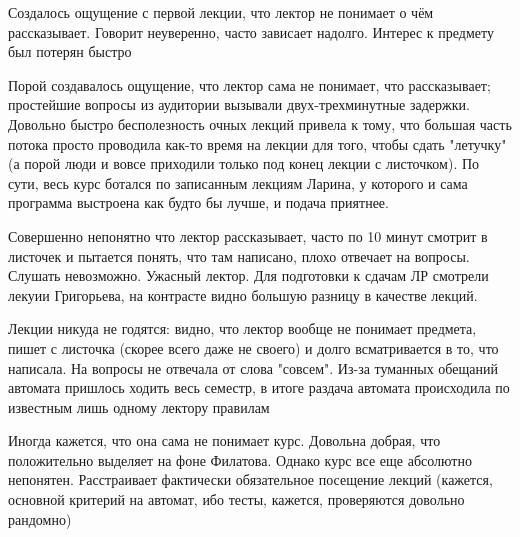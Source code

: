             \begin{commentbox} 
                Создалось ощущение с первой лекции, что лектор не понимает о чём рассказывает. Говорит неуверенно, часто зависает надолго. Интерес к предмету был потерян быстро 
            \end{commentbox} 
        
            \begin{commentbox} 
                Порой создавалось ощущение, что лектор сама не понимает, что рассказывает; простейшие вопросы из аудитории вызывали двух-трехминутные задержки. Довольно быстро бесполезность очных лекций привела к тому, что большая часть потока просто проводила как-то время на лекции для того, чтобы сдать "летучку"(а порой люди и вовсе приходили только под конец лекции с листочком). По сути, весь курс ботался по записанным лекциям Ларина, у которого и сама программа выстроена как будто бы лучше, и подача приятнее. 
            \end{commentbox} 
        
            \begin{commentbox} 
                Совершенно непонятно что лектор рассказывает, часто по 10 минут смотрит в листочек и пытается понять, что там написано, плохо отвечает на вопросы. Слушать невозможно. Ужасный лектор. Для подготовки к сдачам ЛР смотрели лекуии Григорьева, на контрасте видно большую разницу в качестве лекций. 
            \end{commentbox} 
        
            \begin{commentbox} 
                Лекции никуда не годятся: видно, что лектор вообще не понимает предмета, пишет с листочка (скорее всего даже не своего) и долго всматривается в то, что написала. На вопросы не отвечала от слова "совсем".
                Из-за туманных обещаний автомата пришлось ходить весь семестр, в итоге раздача автомата происходила по известным лишь одному лектору правилам 
            \end{commentbox} 
        
            \begin{commentbox} 
                Иногда кажется, что она сама не понимает курс. Довольна добрая, что положительно выделяет на фоне Филатова. Однако курс все еще абсолютно непонятен. Расстраивает фактически обязательное посещение лекций (кажется, основной критерий на автомат, ибо тесты, кажется, проверяются довольно рандомно) 
            \end{commentbox} 
        
